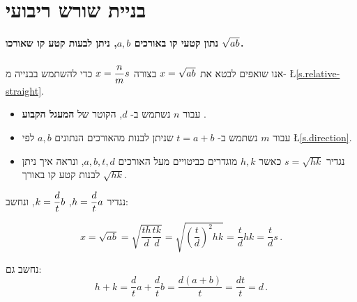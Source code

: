 \section{%
בניית שורש ריבועי%
}\label{s.root}

\textbf{%
נתון קטעי קו באורכים
$a,b$,
ניתן לבעות קטע קו שאורכו
$\rule[-5pt]{0pt}{10pt}\sqrt{ab}$.}

אנו שואפים לבטא את
$\rule[-5pt]{0pt}{20pt}x=\sqrt{ab}$
בצורה
$x=\displaystyle\frac{n}{m}s$
כדי להשתמש בבנייה מ-%
\L{\ref{s.relative-straight}}.
\vspace*{-1ex}
\begin{itemize}
\setlength{\itemsep}{0pt}
\item עבור
$n$
נשתמש ב-%
$d$,
הקוטר של
\textbf{%
המעגל הקבוע%
}.
\item עבור
$m$
נשתמש ב-%
$t=a+b$
שניתן לבנות מהאורכים הנתונים
$a,b$
לפי
\L{\ref{s.direction}}.
\item 
נגדיר
$s=\sqrt{hk}$
כאשר 
$h,k$
מוגדרים כביטויים מעל האורכים
$a,b,t,d$,
ונראה איך ניתן לבנות קטע קו באורך 
$\sqrt{hk}$.
\end{itemize}
\vspace{-1ex}
נגדיר
$h=\displaystyle\frac{d}{t}a$, $k=\displaystyle\frac{d}{t}b$,
ונחשב:
\vspace{-2ex}

\[
x=\sqrt{ab}=\sqrt{\frac{th}{d}\frac{tk}{d}}=\sqrt{\left(\frac{t}{d}\right)^2hk}=\frac{t}{d}hk=\frac{t}{d}s\,.
\]
\vspace{-2ex}

נחשב גם: 
\[
h+k = \frac{d}{t}a + \frac{d}{t}b = \frac{d(a+b)}{t} = \frac{dt}{t} = d\,.
\]

\vspace{-2ex}

